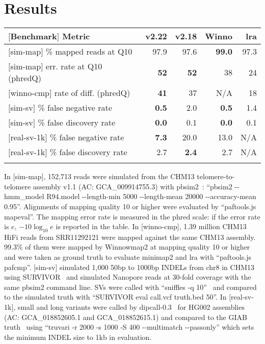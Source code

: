 \documentclass{bioinfo}
\begin{document}
\section{Results}

\begin{table}
{\footnotesize\label{tab:1}\begin{tabular}{p{4.2cm}rrrr}
\toprule
$[$Benchmark$]$ Metric & v2.22 & v2.18 & Winno & lra \\
\midrule
$[$sim-map$]$ \% mapped reads at Q10      & 97.9 & 97.6 & {\bf 99.0} & 97.3 \\
$[$sim-map$]$ err. rate at Q10 (phredQ)   & {\bf 52}   & {\bf 52}   & 38   & 24 \\
$[$winno-cmp$]$  rate of diff. (phredQ)   & {\bf 41}   & 37   & N/A  & 18 \\
$[$sim-sv$]$  \% false negative rate      & {\bf 0.5}  & 2.0  & {\bf 0.5}  & 1.4  \\
$[$sim-sv$]$  \% false discovery rate     & {\bf 0.0}  & 0.1  & {\bf 0.0}  & 0.1  \\
$[$real-sv-1k$]$ \% false negative rate   & {\bf 7.3}  & 20.0 & 13.0 & N/A \\
$[$real-sv-1k$]$ \% false discovery rate  & 2.7  & {\bf 2.4}  & 2.7  & N/A \\
\botrule
\end{tabular}}
{In $[$sim-map$]$, 152,713 reads were simulated from the CHM13 telomere-to-telomere assembly v1.1
(AC: GCA\_009914755.3) with pbsim2~\citep{Ono:2021aa}: ``pbsim2 -{}-hmm\_model R94.model -{}-length-min
5000 -{}-length-mean 20000 -{}-accuracy-mean 0.95''. Alignments of mapping quality
10 or higher were evaluated by ``paftools.js mapeval''. The mapping error rate
is measured in the phred scale: if the error rate is $e$, $-10\log_{10}e$ is
reported in the table. In $[$winno-cmp$]$, 1.39 million CHM13 HiFi reads from
SRR11292121 were mapped against the same CHM13 assembly. 99.3\% of them were mapped by Winnowmap2
at mapping quality 10 or higher and were taken as ground truth to evaluate
minimap2 and lra with ``paftools.js pafcmp''. $[$sim-sv$]$ simulated 1,000
50bp to 1000bp INDELs from chr8 in CHM13 using SURVIVOR~\citep{Jeffares:2017aa} and simulated Nanopore
reads at 30-fold coverage with the same pbsim2 command line. SVs were called with
``sniffles -q 10''~\citep{Sedlazeck:2018ab} and compared to the simulated truth with ``SURVIVOR eval
call.vcf truth.bed 50''. In $[$real-sv-1k$]$, small and long variants were
called by dipcall-0.3~\citep{Li:2018aa} for HG002 assemblies (AC: GCA\_018852605.1 and
GCA\_018852615.1) and compared to the GIAB truth~\citep{Zook:2020aa} using ``truvari -r 2000 -s
1000 -S 400 -{}-multimatch -{}-passonly'' which sets the minimum INDEL size to 1kb in evaluation. }
\end{table}
\end{document}
